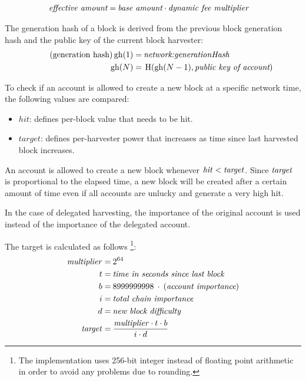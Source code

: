 \begin{align*}
\textit{effective amount} = \: & \textit{base amount} \cdot \textit{dynamic fee multiplier}
\end{align*}


The generation hash of a block is derived from the previous block generation hash and the public key of the current block harvester:
\begin{align*}
\tag{generation hash}
\mathfunc{gh}(1) = \: & \nemsetting{network}{generationHash} \\
\mathfunc{gh}(N) = \: & \hf(\mathfunc{gh}(N - 1), \mathname{public key of account})
\end{align*}

To check if an account is allowed to create a new block at a specific network time, the following values are compared:
\begin{itemize}
\item{ $hit$: defines per-block value that needs to be hit.}
\item{ $target$: defines per-harvester power that increases as time since last harvested block increases.}
\end{itemize}
An account is allowed to create a new block whenever $\mathit{hit} < \mathit{target}$.
Since $\mathit{target}$ is proportional to the elapsed time, a new block will be created after a certain amount of time even if all accounts are unlucky and generate a very high hit.

In the case of delegated harvesting, the importance of the original account is used instead of the importance of the delegated account.

The target is calculated as follows
\footnote{The implementation uses 256-bit integer instead of floating point arithmetic in order to avoid any problems due to rounding.}:
\begin{align*}
\mathit{multiplier} = \: & 2^{64} \\
t = \: & \textit{time in seconds since last block} \\
b = \: & 8999999998 \: \cdot \: (\textit{account importance}) \\
i = \: & \textit{total chain importance} \\
d = \: & \textit{new block difficulty} \\
\mathit{target} = \: & \frac{\mathit{multiplier} \cdot t \cdot b}{i \cdot d}
\end{align*}

